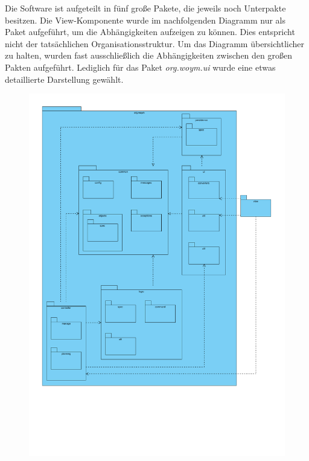 \documentclass[fontsize=12pt,paper=a4,twoside]{scrartcl}
\begin{document}
Die Software ist aufgeteilt in fünf große Pakete, die jeweils noch Unterpakte besitzen. Die View-Komponente wurde im nachfolgenden Diagramm nur als Paket aufgeführt, um die Abhängigkeiten aufzeigen zu können. Dies entspricht nicht der tatsächlichen Organisationsstruktur. Um das Diagramm übersichtlicher zu halten, wurden fast ausschließlich die Abhängigkeiten zwischen den großen Pakten aufgeführt. Lediglich für das Paket \textit{org.woym.ui} wurde eine etwas detaillierte Darstellung gewählt.

\begin{figure}[H]
\centering
\includegraphics[width=\textwidth]{packages.pdf}
\end{figure}

\newpage
\end{document}
